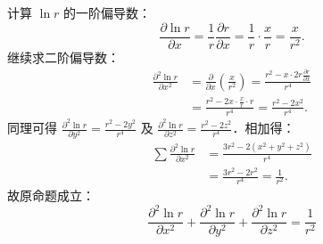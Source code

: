\begin{myproof}
    计算 $\ln r$ 的一阶偏导数：
    \begin{equation}
        \frac{\partial \ln r}{\partial x} = \frac{1}{r} \frac{\partial r}{\partial x} = \frac{1}{r} \cdot \frac{x}{r} = \frac{x}{r^2}.
    \end{equation}
    继续求二阶偏导数：
    \begin{equation}
        \begin{aligned}
            \frac{\partial^2 \ln r}{\partial x^2} & = \frac{\partial}{\partial x} \left( \frac{x}{r^2} \right) = \frac{r^2 - x \cdot 2r \frac{\partial r}{\partial x}}{r^4} \\
                                                  & = \frac{r^2 - 2x \cdot \frac{x}{r} \cdot r}{r^4} = \frac{r^2 - 2x^2}{r^4}.
        \end{aligned}
    \end{equation}
    同理可得 $\frac{\partial^2 \ln r}{\partial y^2} = \frac{r^2 - 2y^2}{r^4}$ 及 $\frac{\partial^2 \ln r}{\partial z^2} = \frac{r^2 - 2z^2}{r^4}$．相加得：
    \begin{equation}
        \begin{aligned}
            \sum \frac{\partial^2 \ln r}{\partial x^2} & = \frac{3r^2 - 2(x^2 + y^2 + z^2)}{r^4}    \\
                                                       & = \frac{3r^2 - 2r^2}{r^4} = \frac{1}{r^2}.
        \end{aligned}
    \end{equation}
    故原命题成立：
    \begin{equation}
        \boxed{\frac{\partial^2 \ln r}{\partial x^2} + \frac{\partial^2 \ln r}{\partial y^2} + \frac{\partial^2 \ln r}{\partial z^2} = \frac{1}{r^2}}
    \end{equation}



\end{myproof}
